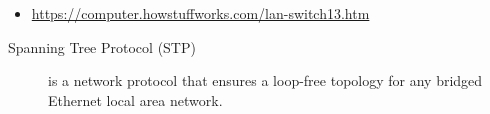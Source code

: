 \begin{itemize}
\item \url{https://computer.howstuffworks.com/lan-switch13.htm}
\end{itemize}

\begin{frame}
  \begin{description}
  \item[Spanning Tree Protocol (STP)] is a network protocol that ensures a loop-free
    topology for any bridged Ethernet local area network.
  \end{description}
  \begin{center}
  \end{center}
\end{frame}

